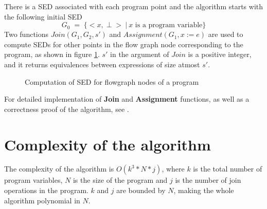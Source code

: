 There is a SED associated with each program point and the algorithm
starts with the following initial SED
$$G_0\; =\; \{<x,\perp>\: |\: x \text{ is a program variable}\}$$ 
Two functions $Join(G_1, G_2, s')$ and $Assignment(G_1, x := e)$ are 
used to compute SEDs for other points in the flow graph node 
corresponding to the program, as shown in figure 
\ref{fig:GulwaniAlgorithm}. $s'$ in the argument of $Join$ is 
a positive integer, and it returns equivalences between expressions of
size atmost $s'$.

\begin{figure}[!ht]
\label{fig:GulwaniAlgorithm}
    \caption{Computation of SED for flowgraph nodes of a program}
\end{figure}

For detailed implementation of \textbf{Join} and \textbf{Assignment} 
functions, as well as a correctness proof of the algorithm, see \cite{Gulwani}.

\section{Complexity of the algorithm}
\label{sec:ComplexityOfTheAlgorithm}
The complexity of the algorithm is $O(k^{3} * N * j)$, where $k$ is  
the total number of program variables, $N$ is the size of the program 
and $j$ is the number of join operations in the program. $k$ and $j$ 
are bounded by $N$, making the whole algorithm polynomial in $N$.